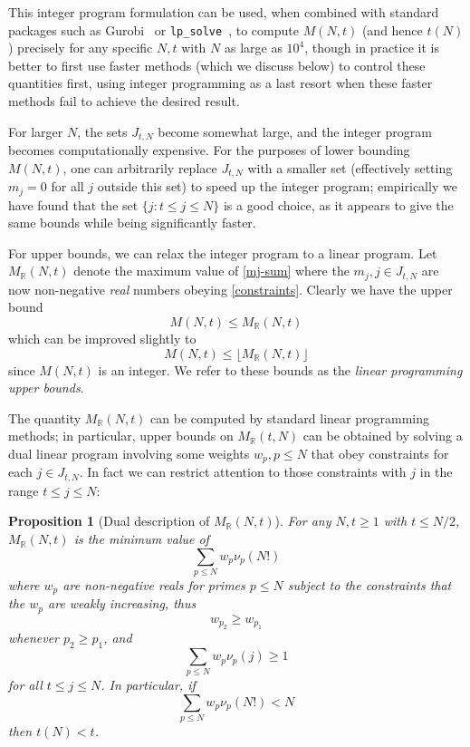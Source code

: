 \documentclass[12pt,a4paper,reqno]{amsart}
\numberwithin{equation}{section}
\theoremstyle{plain}
\newtheorem{proposition}[theorem]{Proposition}
\theoremstyle{definition}
\newcommand\R{\mathbb{R}}
\begin{document}
This integer program formulation can be used, when combined with standard packages such as Gurobi~\cite{gurobi} or \texttt{lp\_solve}~\cite{lpsolve}, to compute $M(N,t)$ (and hence $t(N)$) precisely for any specific $N,t$ with $N$ as large as $10^4$, though in practice it is better to first use faster methods (which we discuss below) to control these quantities first, using integer programming as a last resort when these faster methods fail to achieve the desired result.

For larger $N$, the sets $J_{t,N}$ become somewhat large, and the integer program becomes computationally expensive.  For the purposes of lower bounding $M(N,t)$, one can arbitrarily replace $J_{t,N}$ with a smaller set (effectively setting $m_j=0$ for all $j$ outside this set) to speed up the integer program; empirically we have found that the set $\{ j: t \leq j \leq N \}$ is a good choice, as it appears to give the same bounds while being significantly faster.

For upper bounds, we can relax the integer program to a linear program.  Let $M_\R(N,t)$ denote the maximum value of \eqref{mj-sum} where the $m_j, j \in J_{t,N}$ are now non-negative \emph{real} numbers obeying \eqref{constraints}.  Clearly we have the upper bound
$$ M(N,t) \leq M_\R(N,t)$$
which can be improved slightly to
\begin{equation}\label{lp-upper} 
  M(N,t) \leq \lfloor M_\R(N,t)\rfloor
\end{equation}
since $M(N,t)$ is an integer.  We refer to these bounds as the \emph{linear programming upper bounds}.

The quantity $M_\R(N,t)$ can be computed by standard linear programming methods; in particular, upper bounds on $M_\R(t,N)$ can be obtained by solving a dual linear program involving some weights $w_p, p \leq N$ that obey constraints for each $j \in J_{t,N}$.  In fact we can restrict attention to those constraints with $j$ in the range $t \leq j \leq N$:

\begin{proposition}[Dual description of $M_\R(N,t)$]\label{dual-desc} For any $N,t \geq 1$ with $t \leq N/2$, $M_\R(N,t)$ is the minimum value of
\begin{equation}\label{hyp}
    \sum_{p \leq N} w_p \nu_p(N!)
\end{equation}
where $w_p$ are non-negative reals for primes $p \leq N$
subject to the constraints that the $w_p$ are weakly increasing, thus
\begin{equation}\label{wp-decrease}
w_{p_2} \geq w_{p_1}
\end{equation}
whenever $p_2 \geq p_1$, and 
\begin{equation}\label{pj}
  \sum_{p \leq N} w_p \nu_p(j) \geq 1
 \end{equation}
for all $t \leq j \leq N$.  In particular, if
\begin{equation}\label{hyp-low}
  \sum_{p \leq N} w_p \nu_p(N!) < N
\end{equation}
then $t(N) < t$.
\end{proposition}
\end{document}
